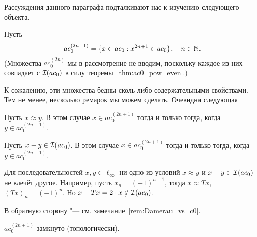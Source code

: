 Рассуждения данного параграфа подталкивают нас к изучению следующего объекта.

Пусть
\begin{equation}
	ac_0^{(2n+1)} = \{ x\in ac_0 : x^{2n+1} \in ac_0\}, \quad n\in\mathbb{N}
	.
\end{equation}
(Множества $ac_0^{(2n)}$ мы в рассмотрение не вводим, поскольку каждое из них совпадает с $\mathcal{I}(ac_0)$ в силу теоремы~\ref{thm:ac0_pow_even}.)

К сожалению, эти множества бедны сколь-либо содержательными свойствами.
Тем не менее, несколько ремарок мы можем сделать.
Очевидна следующая
\begin{lemma}
	Пусть $x \approx y$.
	В этом случае $x \in ac_0^{(2n+1)}$ тогда и только тогда, когда $y \in ac_0^{(2n+1)}$.
\end{lemma}

\begin{lemma}
	Пусть $x - y \in \mathcal{I}(ac_0)$.
	В этом случае $x \in ac_0^{(2n+1)}$ тогда и только тогда, когда $y \in ac_0^{(2n+1)}$.
\end{lemma}


\begin{remark}
	Для последовательностей $x,y \in \ell_\infty$ ни одно из условий $x\approx y$ и $x-y\in\mathcal{I}(ac_0)$
	не влечёт другое.
	Например, пусть $x_n = (-1)^{n+1}$, тогда $x \approx Tx$, $(Tx)_n = (-1)^{n}$.
	Но $x-Tx = 2 \cdot x \notin \mathcal{I}(ac_0)$.

	В обратную сторону "--- см. замечание~\ref{rem:Damerau_vs_c0}.
\end{remark}



\begin{hypothesis}
	$ac_0^{(2n+1)}$ замкнуто (топологически).
\end{hypothesis}

